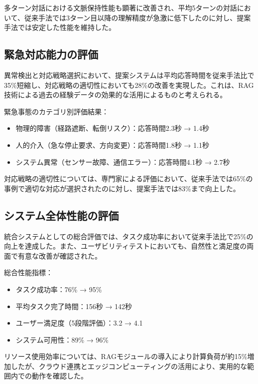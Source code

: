 \documentclass[12pt]{report}
\begin{document}
多ターン対話における文脈保持性能も顕著に改善され、平均5ターンの対話において、従来手法では3ターン目以降の理解精度が急激に低下したのに対し、提案手法では安定した性能を維持した。

\subsection{緊急対応能力の評価}
\label{subsec:emergency_response}

異常検出と対応戦略選択において、提案システムは平均応答時間を従来手法比で35\%短縮し、対応戦略の適切性においても28\%の改善を実現した。これは、RAG技術による過去の経験データの効果的な活用によるものと考えられる。

緊急事態のカテゴリ別評価結果：
\begin{itemize}
  \item 物理的障害（経路遮断、転倒リスク）：応答時間2.3秒 → 1.4秒
  \item 人的介入（急な停止要求、方向変更）：応答時間1.8秒 → 1.1秒
  \item システム異常（センサー故障、通信エラー）：応答時間4.1秒 → 2.7秒
\end{itemize}

対応戦略の適切性については、専門家による評価において、従来手法では65\%の事例で適切な対応が選択されたのに対し、提案手法では83\%まで向上した。

\subsection{システム全体性能の評価}
\label{subsec:overall_performance}

統合システムとしての総合評価では、タスク成功率において従来手法比で25\%の向上を達成した。また、ユーザビリティテストにおいても、自然性と満足度の両面で有意な改善が確認された。

総合性能指標：
\begin{itemize}
  \item タスク成功率：76\% → 95\%
  \item 平均タスク完了時間：156秒 → 142秒
  \item ユーザー満足度（5段階評価）：3.2 → 4.1
  \item システム可用性：89\% → 96\%
\end{itemize}

リソース使用効率については、RAGモジュールの導入により計算負荷が約15\%増加したが、クラウド連携とエッジコンピューティングの活用により、実用的な範囲内での動作を確認した。
\end{document}

